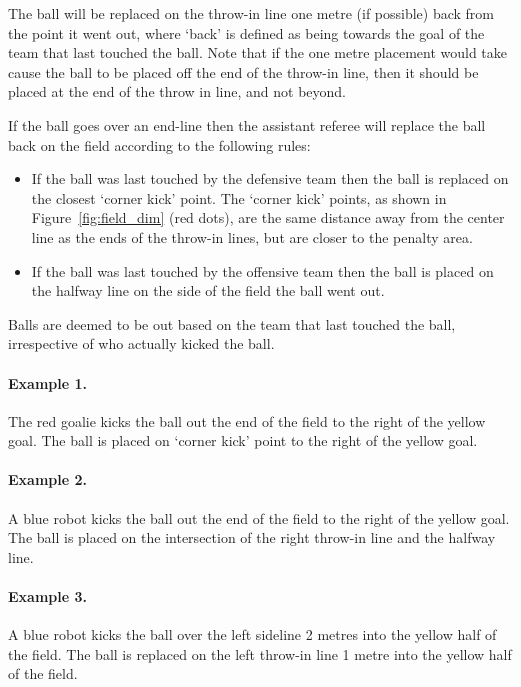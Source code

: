 \documentclass[12pt]{article}
\begin{document}
The ball will be replaced on the throw-in line one metre (if possible)
back from the point it went out, where `back' is defined as being towards
the goal of the team that last touched the ball. Note that if the one metre placement would take cause the ball to be placed
off the end of the throw-in line, then it should be placed at the end of the throw in line, and not beyond.

If the ball goes over an end-line then the assistant referee will
replace the ball back on the field according to the following rules:
\begin{itemize}
\item If the ball was last touched by the defensive team then the ball
  is replaced on the closest `corner kick' point. The `corner kick'
  points, as shown in Figure~\ref{fig:field_dim} (red dots), are the
  same distance away from the center line as the ends of the throw-in
  lines, but are closer to the penalty area.
\item If the ball was last touched by the offensive team then the ball
  is placed on the halfway line on the side of the field the ball went
  out.
\end{itemize}

Balls are deemed to be out based on the team that last touched the
ball, irrespective of who actually kicked the ball.

\paragraph{Example 1.} The red goalie kicks the ball out the end of the
field to the right of the yellow goal.  The ball is placed on `corner kick' point
to the right of the yellow goal.

\paragraph{Example 2.} A blue robot kicks the ball out the end of the
field to the right of the yellow goal. The ball is placed on the intersection
of the right throw-in line and the halfway line.

\paragraph{Example 3.} A blue robot kicks the ball over the left
sideline 2 metres into the yellow half of the field. The ball is
replaced on the left throw-in line 1 metre into the yellow half of the field.
\end{document}
